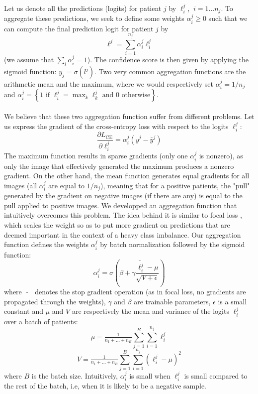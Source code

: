 \documentclass[final]{cvpr}
\begin{document}
	Let us denote all the predictions (logits) for patient $j$ by $\ell_i^j$, $\: i=1 \dots n_j$.
	To aggregate these predictions, we seek to define some weights $\alpha_i^j \geq 0$ such that we can compute the final prediction logit for patient $j$ by
	$$\ell^j = \sum_{i=1}^{n_j} \alpha_i^j \ell_i^j$$
	(we assume that $\sum_i \alpha_i^j = 1$).
	The confidence score is then given by applying the sigmoid function: $y_j = \sigma(l^j)$.
	Two very common aggregation functions are the arithmetic mean and the maximum, where we would respectively set $\alpha_i^j = 1/n_j$ and $\alpha_i^j = \left\{ 1 \text{ if } \ell_i^j = \max_k \ell_k^j \text{ and } 0 \text{ otherwise}\right\}$.\\
	\\
	We believe that these two aggregation function suffer from different problems. Let us express the gradient of the cross-entropy loss with respect to the logits $\ell_i^j$:
	$$\frac{\partial L_{\text{CE}}}{\partial \ell_i^j} = \alpha_i^j \left(y^j - \bar{y}^j\right)$$
	The maximum function results in sparse gradients (only one $\alpha_i^j$ is nonzero), as only the image that effectively generated the maximum produces a nonzero gradient. On the other hand, the mean function generates equal gradients for all images (all $\alpha_i^j$ are equal to $1/n_j$), meaning that for a positive patients, the "pull" generated by the gradient on negative images (if there are any) is equal to the pull applied to positive images. We developped an aggregation function that intuitively overcomes this problem.
	The idea behind it is similar to focal loss \cite{focal}, which scales the weight so as to put more gradient on predictions that are deemed important in the context of a heavy class imbalance.
	Our aggregation function defines the weights $\alpha_i^j$ by batch normalization \cite{bn} followed by the sigmoid function:
	$$ \alpha_i^j = \sigma\left(\beta + \gamma \frac{\widetilde{\ell_i^j} - \mu}{\sqrt{V+\epsilon}}\right) $$
	where $\; \widetilde{\text{ }} \;$ denotes the stop gradient operation (as in focal loss, no gradients are propagated through the weights), $\gamma$ and $\beta$ are trainable parameters, $\epsilon$ is a small constant and $\mu$ and $V$ are respectively the mean and variance of the logits $\ell_i^j$ over a batch of patients:
	$$\mu = \tfrac 1 {n_1+\dots+n_B} \sum_{j=1}^{B} \sum_{i=1}^{n_j} \ell_i^j$$
	$$V = \tfrac 1 {n_1+\dots+n_B} \sum_{j=1}^{B} \sum_{i=1}^{n_j} \left(\ell_i^j - \mu \right)^2$$
	where $B$ is the batch size. Intuitively, $\alpha_i^j$ is small when $\ell_i^j$ is small compared to the rest of the batch, i.e, when it is likely to be a negative sample.
	
\end{document}
